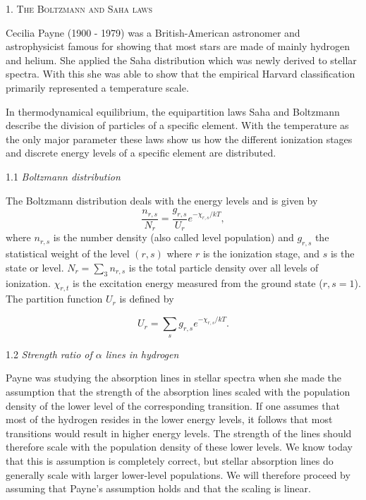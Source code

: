 \documentclass[a4paper,11.5pt,]{article}
\begin{document}
\begin{multicols}{2}

\begin{center}
\textsc{1. The Boltzmann and Saha laws}
\end{center}
Cecilia Payne (1900 - 1979) was a British-American astronomer and astrophysicist famous for showing that most stars are made of mainly hydrogen and helium. She applied the Saha distribution which was newly derived to stellar spectra. With this she was able to show that the empirical Harvard classification primarily represented a temperature scale.

In thermodynamical equilibrium, the equipartition laws Saha and Boltzmann describe the division of particles of a specific element. With the temperature as the only major parameter these laws show us how the different ionization stages and discrete energy levels of a specific element are distributed.

\begin{center}
1.1 \textit{Boltzmann distribution}
\end{center}
The Boltzmann distribution deals with the energy levels and is given by
\begin{equation}\label{eq:1}
    \frac{n_{r,s}}{N_r} = \frac{g_{r,s}}{U_r} e^{-\chi_{r,s}/kT},
\end{equation}
where $n_{r,s}$ is the number density (also called level population) and $g_{r,s}$ the statistical weight of the level $(r,s)$ where $r$ is the ionization stage, and $s$ is the state or level. $N_r = \sum_3 n_{r,s}$ is the total particle density over all levels of ionization. $\chi_{r,t}$ is the excitation energy measured from the ground state ($r,s=1$). The partition function $U_r$ is defined by

\begin{equation}\label{eq:2}
    U_r = \sum_s g_{r,s} e^{-\chi_{r,s}/kT}.
\end{equation}

\begin{center}
1.2 \textit{Strength ratio of $\alpha$ lines in hydrogen}
\end{center}
Payne was studying the absorption lines in stellar spectra when she made the assumption that the strength of the absorption lines scaled with the population density of the lower level of the corresponding transition. If one assumes that most of the hydrogen resides in the lower energy levels, it follows that most transitions would result in higher energy levels. The strength of the lines should therefore scale with the population density of these lower levels. We know today that this is assumption is completely correct, but stellar absorption lines do generally scale with larger lower-level populations. We will therefore proceed by assuming that Payne's assumption holds and that the scaling is linear.


\end{multicols}
\end{document}
